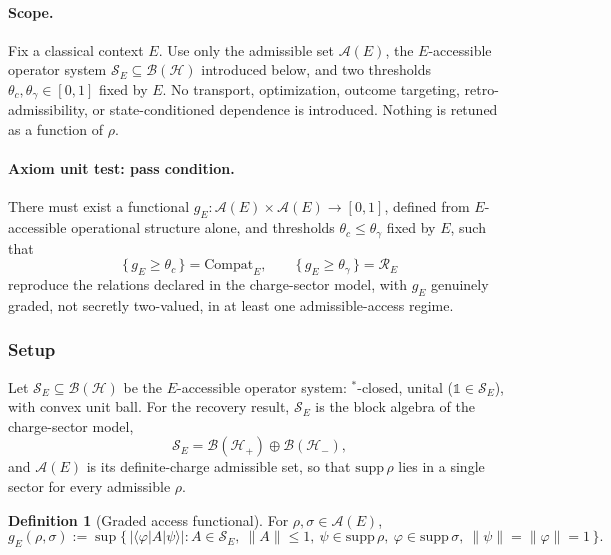 \documentclass[aps,prx,onecolumn,11pt]{revtex4-2}
\theoremstyle{plain}
\theoremstyle{definition}
\newtheorem{definition}{Definition}
\theoremstyle{remark}
\begin{document}
\paragraph{Scope.}
Fix a classical context \(E\). Use only the admissible set
\(\mathcal A(E)\), the \(E\)-accessible operator system
\(\mathcal S_E\subseteq\mathcal B(\mathcal H)\) introduced below, and
two thresholds \(\theta_c,\theta_\gamma\in[0,1]\) fixed by \(E\). No
transport, optimization, outcome targeting, retro-admissibility, or
state-conditioned dependence is introduced. Nothing is retuned as a
function of \(\rho\).

\paragraph{Axiom unit test: pass condition.}
There must exist a functional
\(g_E:\mathcal A(E)\times\mathcal A(E)\to[0,1]\), defined from
\(E\)-accessible operational structure alone, and thresholds
\(\theta_c\le\theta_\gamma\) fixed by \(E\), such that
\[
\{\,g_E\ge\theta_c\,\}=\mathrm{Compat}_E,
\qquad
\{\,g_E\ge\theta_\gamma\,\}=\mathcal R_E
\]
reproduce the relations declared in the charge-sector model, with
\(g_E\) genuinely graded, not secretly two-valued, in at least one
admissible-access regime.

\subsubsection{Setup}
\label{toy:shadow_setup}

Let \(\mathcal S_E\subseteq\mathcal B(\mathcal H)\) be the
\(E\)-accessible operator system: \({}^*\)-closed, unital
(\(\mathbb 1\in\mathcal S_E\)), with convex unit ball. For the recovery
result, \(\mathcal S_E\) is the block algebra of the charge-sector
model,
\[
\mathcal S_E=\mathcal B(\mathcal H_+)\oplus\mathcal B(\mathcal H_-),
\]
and \(\mathcal A(E)\) is its definite-charge admissible set, so that
\(\mathrm{supp}\,\rho\) lies in a single sector for every admissible
\(\rho\).

\begin{definition}[Graded access functional]
\label{def:toy_shadow_g}
For \(\rho,\sigma\in\mathcal A(E)\),
\begin{equation}
g_E(\rho,\sigma)
:=
\sup\bigl\{\,
\lvert\langle\varphi\rvert A\lvert\psi\rangle\rvert
:
A\in\mathcal S_E,\ \lVert A\rVert\le 1,\
\psi\in\mathrm{supp}\,\rho,\
\varphi\in\mathrm{supp}\,\sigma,\
\lVert\psi\rVert=\lVert\varphi\rVert=1
\,\bigr\}.
\label{eq:toy_shadow_g_def}
\end{equation}
\end{definition}
\end{document}
